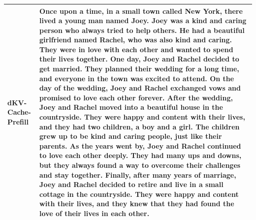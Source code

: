 \documentclass{article}
\newcommand{\pmethodname}{dKV-Cache-Prefill}
\begin{document}
\begin{table}[t]
\begin{tabular}{p{2cm}|p{11cm}}
    \midrule
    \pmethodname & Once upon a time, in a small town called New York, there lived a young man named Joey. Joey was a kind and caring person who always tried to help others. He had a beautiful girlfriend named Rachel, who was also kind and caring. They were in love with each other and wanted to spend their lives together.
One day, Joey and Rachel decided to get married. They planned their wedding for a long time, and everyone in the town was excited to attend. On the day of the wedding, Joey and Rachel exchanged vows and promised to love each other forever.
After the wedding, Joey and Rachel moved into a beautiful house in the countryside. They were happy and content with their lives, and they had two children, a boy and a girl. The children grew up to be kind and caring people, just like their parents.
As the years went by, Joey and Rachel continued to love each other deeply. They had many ups and downs, but they always found a way to overcome their challenges and stay together.
Finally, after many years of marriage, Joey and Rachel decided to retire and live in a small cottage in the countryside. They were happy and content with their lives, and they knew that they had found the love of their lives in each other.\\
    \bottomrule
    \end{tabular}
\end{table}
\end{document}
